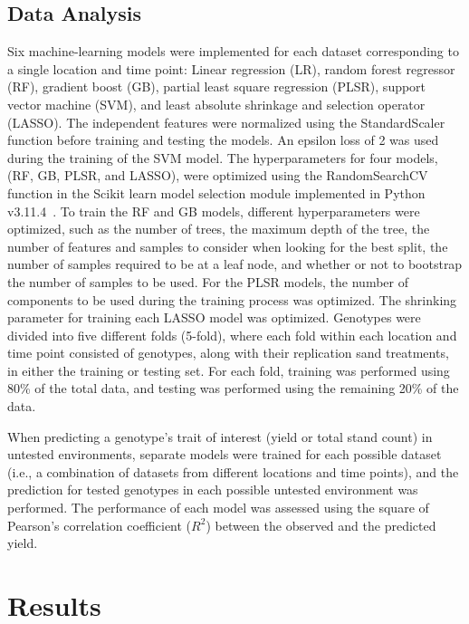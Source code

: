 \documentclass[12pt,twoside]{gsag3jnl}
\begin{document}
\subsection{Data Analysis}
Six machine-learning models were implemented for each dataset corresponding to a single location and time point: Linear regression (LR), random forest regressor (RF), gradient boost (GB), partial least square regression (PLSR), support vector machine (SVM), and least absolute shrinkage and selection operator (LASSO). The independent features were normalized using the StandardScaler function before training and testing the models. An epsilon loss of 2 was used during the training of the SVM model. The hyperparameters for four models, (RF, GB, PLSR, and LASSO), were optimized using the RandomSearchCV function in the Scikit learn model selection module implemented in Python v3.11.4~\citep{scikit-learn}. To train the RF and GB models, different hyperparameters were optimized, such as the number of trees, the maximum depth of the tree, the number of features and samples to consider when looking for the best split, the number of samples required to be at a leaf node, and whether or not to bootstrap the number of samples to be used. For the PLSR models, the number of components to be used during the training process was optimized. The shrinking parameter for training each LASSO model was optimized. Genotypes were divided into five different folds (5-fold), where each fold within each location and time point consisted of genotypes, along with their replication sand treatments, in either the training or testing set. For each fold, training was performed using 80\% of the total data, and testing was performed using the remaining 20\% of the data.

When predicting a genotype's trait of interest (yield or total stand count) in untested environments, separate models were trained for each possible dataset (i.e., a combination of datasets from different locations and time points), and the prediction for tested genotypes in each possible untested environment was performed. The performance of each model was assessed using the square of Pearson's correlation coefficient ($R^2$) between the observed and the predicted yield.

\section{Results}
\end{document}
